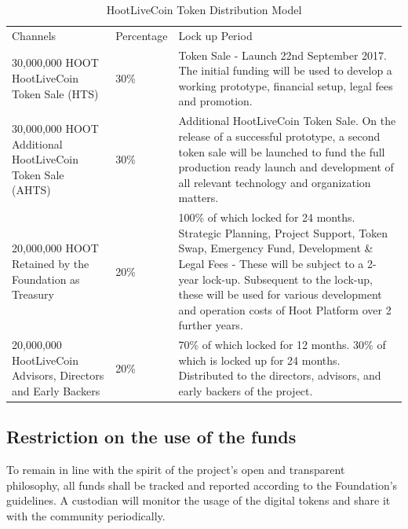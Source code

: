 \documentclass{article}
\begin{document}
\begin{table}[!htb]
\centering
\begin{tabular}{ |p{2.8cm}|p{2.5cm}|p{5cm}|}
\hline
\rowcolor{lightgray} \multicolumn{3}{|c|}{HootLiveCoin Token Distribution Model} \\
\hline
Channels & Percentage & Lock up Period \\
\hline
30,000,000 HOOT HootLiveCoin Token Sale (HTS) & 30\% & Token Sale - Launch 22nd September 2017. The initial funding will be used to develop a working prototype, financial setup, legal fees and promotion.
 \\
 \hline
30,000,000 HOOT Additional HootLiveCoin Token Sale (AHTS) & 30\% & Additional HootLiveCoin Token Sale. On the release of a successful prototype, a second token sale will be launched to fund the full production ready launch and development of all relevant technology and organization matters.
\\
\hline
20,000,000 HOOT Retained by the Foundation as Treasury & 20\% & 100\% of which locked for 24 months. Strategic Planning, Project Support, Token Swap, Emergency Fund, Development \& Legal Fees - These will be subject to a 2- year lock-up. Subsequent to the lock-up, these will be used for various development and operation costs of Hoot Platform over 2 further years.
\\
\hline
20,000,000 HootLiveCoin Advisors, Directors and Early Backers & 20\% & 70\% of which locked for 12 months. 30\% of which is locked up for 24 months. Distributed to the directors, advisors, and early backers of the
 project.
\\
 \hline
\end{tabular}
\caption{HootLiveCoin Token Distribution Model}
\label{table:hoot_token_distribution_model}
\end{table}


\subsection{Restriction on the use of the funds} %
\label{sub:restriction_on_the_use_of_the_funds}
To remain in line with the spirit of the project’s open and transparent philosophy, all funds shall be tracked and reported according to the Foundation’s guidelines. A custodian will monitor the usage of the digital tokens and share it with the community periodically.
\end{document}
